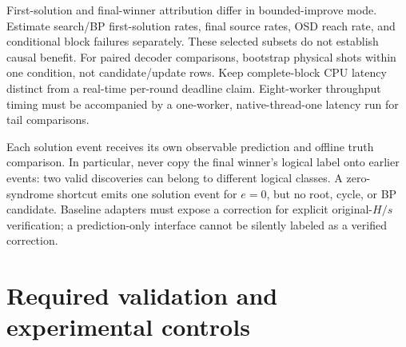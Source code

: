 \documentclass[11pt,a4paper]{article}
\begin{document}
First-solution and final-winner attribution differ in bounded-improve mode. Estimate search/BP first-solution rates, final source rates, OSD reach rate, and conditional block failures separately. These selected subsets do not establish causal benefit. For paired decoder comparisons, bootstrap physical shots within one condition, not candidate/update rows. Keep complete-block CPU latency distinct from a real-time per-round deadline claim. Eight-worker throughput timing must be accompanied by a one-worker, native-thread-one latency run for tail comparisons.

Each solution event receives its own observable prediction and offline truth comparison. In particular, never copy the final winner's logical label onto earlier events: two valid discoveries can belong to different logical classes. A zero-syndrome shortcut emits one solution event for $e=0$, but no root, cycle, or BP candidate. Baseline adapters must expose a correction for explicit original-$H/s$ verification; a prediction-only interface cannot be silently labeled as a verified correction.

\section{Required validation and experimental controls}
\end{document}
